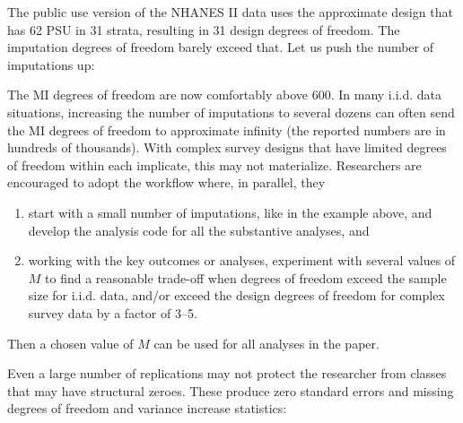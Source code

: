 \begin{stlog}
\nullskip
\end{stlog}

The public use version of the NHANES II data uses the approximate
design that has 62 PSU in 31 strata, resulting in 31 design degrees 
of freedom. The imputation degrees of freedom barely exceed that.
Let us push the number of imputations up:

\begin{stlog}
\nullskip
\end{stlog}

The MI degrees of freedom are now comfortably above 600.
In many i.i.d. data situations, increasing the number of imputations
to several dozens can often send the MI degrees of freedom to 
approximate infinity (the reported numbers are in hundreds 
of thousands). With complex survey designs that have limited
degrees of freedom within each implicate, this may not materialize.
Researchers are encouraged to adopt the workflow where, in parallel,
they

\begin{enumerate}
  \item start with a small number of imputations, like 
        in the example above, and develop the analysis code for all
        the substantive analyses, and
  \item working with the key outcomes or analyses, 
        experiment with several values of $M$ to find a reasonable
        trade-off when degrees of freedom exceed the sample size 
        for i.i.d. data, and/or exceed the design degrees of freedom
        for complex survey data by a factor of 3--5.
\end{enumerate}

Then a chosen value of $M$ can be used for all analyses in the paper.

Even a large number of replications may not protect the researcher
from classes that may have structural zeroes. These produce
zero standard errors and missing degrees of freedom and 
variance increase statistics:

\begin{stlog}
\nullskip
\end{stlog}



\newpage




